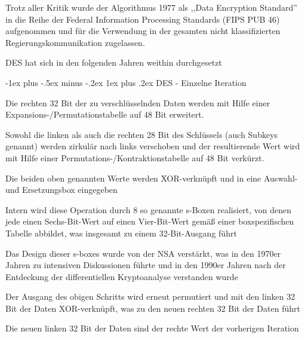 \documentclass[a4paper]{article}
\makeatletter
\renewcommand{\subsubsection}{\@startsection{subsubsection}{3}{0mm}%
 {-1ex plus -.5ex minus -.2ex}%
 {1ex plus .2ex}%
 {\normalfont\small\bfseries}}
\makeatother
\begin{document}
\begin{multicols}{3}
\begin{itemize*}
\begin{itemize*}
            \end{itemize*}
            \item Trotz aller Kritik wurde der Algorithmus 1977 als ,,Data Encryption
            Standard'' in die Reihe der Federal Information Processing Standards
            (FIPS PUB 46) aufgenommen und für die Verwendung in der gesamten nicht
            klassifizierten Regierungskommunikation zugelassen.
            \item DES hat sich in den folgenden Jahren weithin durchgesetzt
      \end{itemize*}




      \subsubsection{DES - Einzelne
            Iteration}

      \begin{itemize*}
            \item Die rechten 32 Bit der zu verschlüsselnden Daten werden mit Hilfe
            einer Expansions-/Permutationstabelle auf 48 Bit erweitert.
            \item Sowohl die linken als auch die rechten 28 Bit des Schlüssels (auch
            Subkeys genannt) werden zirkulär nach links verschoben und der
            resultierende Wert wird mit Hilfe einer
            Permutations-/Kontraktionstabelle auf 48 Bit verkürzt.
            \item Die beiden oben genannten Werte werden XOR-verknüpft und in eine
            Auswahl- und Ersetzungsbox eingegeben
            \begin{itemize*}
                  \item Intern wird diese Operation durch 8 so genannte s-Boxen realisiert, von denen jede einen Sechs-Bit-Wert auf einen Vier-Bit-Wert gemäß einer boxspezifischen Tabelle abbildet, was insgesamt zu einem 32-Bit-Ausgang führt
                  \item Das Design dieser s-boxes wurde von der NSA verstärkt, was in den 1970er Jahren zu intensiven Diskussionen führte und in den 1990er Jahren nach der Entdeckung der differentiellen Kryptoanalyse verstanden wurde
            \end{itemize*}
            \item Der Ausgang des obigen Schritts wird erneut permutiert und mit den
            linken 32 Bit der Daten XOR-verknüpft, was zu den neuen rechten 32 Bit
            der Daten führt
            \item Die neuen linken 32 Bit der Daten sind der rechte Wert der vorherigen
            Iteration
      \end{itemize*}



\end{multicols}
\end{document}

